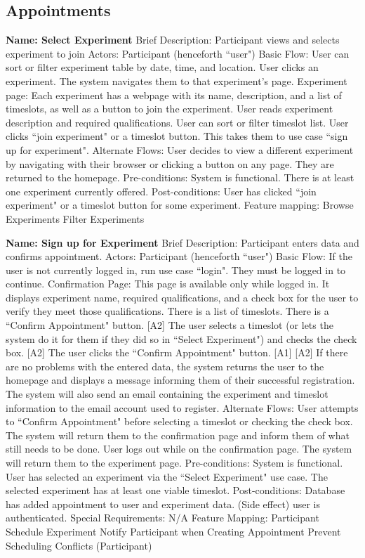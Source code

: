 \subsection{Appointments}
\begin{outline}[enumerate]
\1 {\bf Name: Select Experiment}
\2 Brief Description: Participant views and selects experiment to join
\2 Actors: Participant (henceforth ``user")
\2 Basic Flow:
\3 User can sort or filter experiment table by date, time, and location.
\3 User clicks an experiment.  The system navigates them to that experiment's page.
\3 Experiment page: Each experiment has a webpage with its name, description, and a list of timeslots, as well as a button to join the experiment.
\3 User reads experiment description and required qualifications.
\3 User can sort or filter timeslot list.
\3 User clicks ``join experiment" or a timeslot button.  This takes them to use case ``sign up for experiment".
\2 Alternate Flows:
\3 [A1] User decides to view a different experiment by navigating with their browser or clicking a button on any page.  They are returned to the homepage.
\2 Pre-conditions:
\3 System is functional.
\3 There is at least one experiment currently offered.
\2 Post-conditions:
\3 User has clicked ``join experiment" or a timeslot button for some experiment.
\2 Feature mapping:
\3 Browse Experiments
\3 Filter Experiments

\1 {\bf Name: Sign up for Experiment}
\2 Brief Description: Participant enters data and confirms appointment.
\2 Actors: Participant (henceforth ``user")
\2 Basic Flow:
\3 If the user is not currently logged in, run use case ``login".  They must be logged in to continue.
\3 Confirmation Page: This page is available only while logged in.  It displays experiment name, required qualifications, and a check box for the user to verify they meet those qualifications. There is a list of timeslots. There is a ``Confirm Appointment" button. [A2]
\3 The user selects a timeslot (or lets the system do it for them if they did so in ``Select Experiment") and checks the check box. [A2]
\3 The user clicks the ``Confirm Appointment" button. [A1] [A2]
\3 If there are no problems with the entered data, the system returns the user to the homepage and displays a message informing them of their successful registration.  The system will also send an email containing the experiment and timeslot information to the email account used to register.
\2 Alternate Flows:
\3 [A1] User attempts to ``Confirm Appointment" before selecting a timeslot or checking the check box.
\4 The system will return them to the confirmation page and inform them of what still needs to be done.
\3 [A2] User logs out while on the confirmation page.  The system will return them to the experiment page.
\2 Pre-conditions:
\3 System is functional.
\3 User has selected an experiment via the ``Select Experiment" use case.
\3 The selected experiment has at least one viable timeslot.
\2 Post-conditions:
\3 Database has added appointment to user and experiment data.
\3 (Side effect) user is authenticated.
\2 Special Requirements:
\3 N/A
\2 Feature Mapping:
\3 Participant Schedule Experiment
\3 Notify Participant when Creating Appointment
\3 Prevent Scheduling Conflicts (Participant)
\end{outline}

